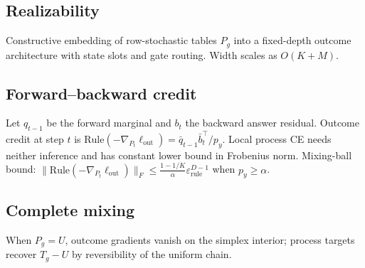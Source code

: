 
\subsection{Realizability}
Constructive embedding of row-stochastic tables $P_g$ into a fixed-depth outcome
architecture with state slots and gate routing. Width scales as $O(K+M)$.

\subsection{Forward--backward credit}
Let $q_{t-1}$ be the forward marginal and $b_t$ the backward answer residual.
Outcome credit at step $t$ is $\mathrm{Rule}(-\nabla_{P_t}\ell_{\mathrm{out}})=
\bar q_{t-1}\bar b_t^\top/p_y$. Local process CE needs neither inference and has
constant lower bound in Frobenius norm. Mixing-ball bound:
$\|\mathrm{Rule}(-\nabla_{P_t}\ell_{\mathrm{out}})\|_F\le
\frac{1-1/K}{\alpha}\varepsilon_{\mathrm{rule}}^{D-1}$ when $p_y\ge\alpha$.

\subsection{Complete mixing}
When $P_g=U$, outcome gradients vanish on the simplex interior; process targets
recover $T_g-U$ by reversibility of the uniform chain.
